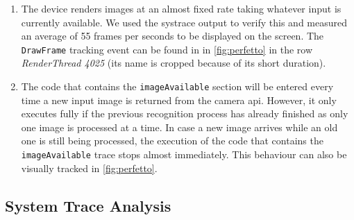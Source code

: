 \documentclass[
			   fontsize=11pt,
               paper=a4,
               bibliography=totoc,
               idxtotoc,
               headsepline,
               footsepline,
               footinclude=false,
               BCOR=12mm,
               DIV=13,
               openany,   %
               oneside    %
               ]
               {scrbook}
\newcommand{\code}[1]{\lstinline[basicstyle = \ttfamily\small]{#1}} %
\begin{document}
\begin{enumerate}
	\item The device renders images at an almost fixed rate taking whatever input is currently available. We used the systrace output to verify this and measured an average of 55 frames per seconds to be displayed on the screen. The \code{DrawFrame} tracking event can be found in in \autoref{fig:perfetto} in the row \textit{RenderThread 4025} (its name is cropped because of its short duration).
	\item The code that contains the \code{imageAvailable} section will be entered every time a new input image is returned from the camera \gls{api}. However, it only executes fully if the previous recognition process has already finished as only one image is processed at a time. In case a new image arrives while an old one is still being processed, the execution of the code that contains the \code{imageAvailable} trace stops almost immediately. This behaviour can also be visually tracked in \autoref{fig:perfetto}.
\end{enumerate}

\subsection{System Trace Analysis}
\end{document}
